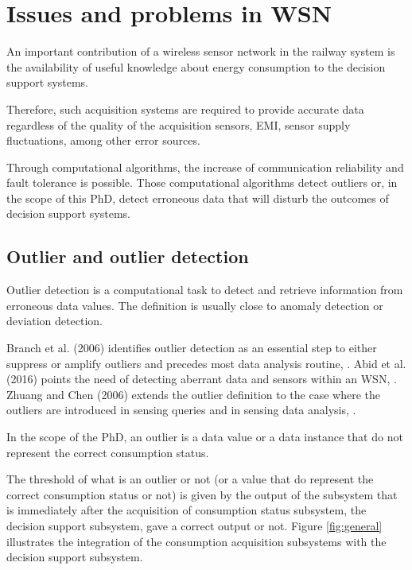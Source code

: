 
\section{Issues and problems in WSN}
An important contribution of a wireless sensor network in the railway system is the availability of useful knowledge about energy consumption to the decision support systems.

Therefore, such acquisition systems are required to provide accurate data regardless of the quality of the acquisition sensors, \ac{EMI}, sensor supply fluctuations, among other error sources.

Through computational algorithms, the increase of communication reliability and fault tolerance is possible. Those computational algorithms detect outliers or, in the scope of this PhD, detect erroneous data that will disturb the outcomes of decision support systems. 



\subsection{Outlier and outlier detection}

\label{sec:def}
Outlier detection is a computational task to detect and retrieve information from erroneous data values. The definition is usually close to anomaly detection or deviation detection. 

Branch et al. (2006) identifies outlier detection as an essential step to either suppress or amplify outliers and precedes most data analysis routine, \cite{class:branch:2006}. Abid et al. (2016) points the need of detecting aberrant data and sensors within an \ac{WSN}, \cite{nn:abid:2016}.  Zhuang and Chen (2006) extends the outlier definition to the case where the outliers are introduced in sensing queries and in sensing data analysis, \cite{nn:zhuang:2006}.

\vspace{1em}

In the scope of the PhD, an outlier is a data value or a data instance that do not represent the correct consumption status.

The threshold of what is an outlier or not (or a value that do represent the correct consumption status or not) is given by the output of the subsystem that is immediately after the acquisition of consumption status subsystem, the decision support subsystem, gave a correct output or not. Figure \ref{fig:general} illustrates the integration of the consumption acquisition subsystems with the decision support subsystem.


